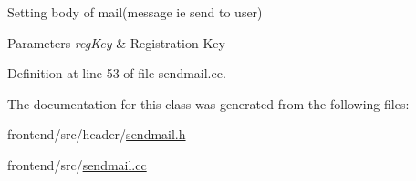 Setting body of mail(message ie send to user) 


\begin{DoxyParams}{Parameters}
{\em reg\-Key} & Registration Key \\
\hline
\end{DoxyParams}


Definition at line 53 of file sendmail.\-cc.



The documentation for this class was generated from the following files\-:\begin{DoxyCompactItemize}
\item 
frontend/src/header/\hyperlink{sendmail_8h}{sendmail.\-h}\item 
frontend/src/\hyperlink{sendmail_8cc}{sendmail.\-cc}\end{DoxyCompactItemize}
